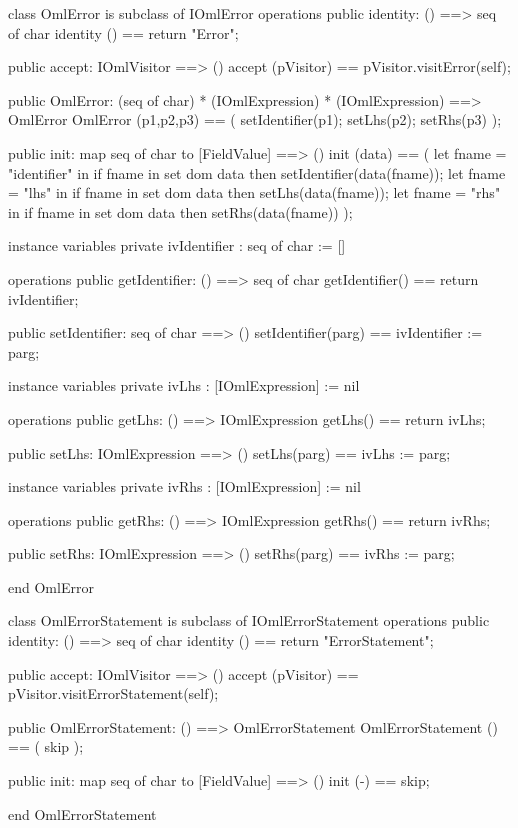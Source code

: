 \begin{vdm_al}
class OmlError is subclass of IOmlError
operations
  public identity: () ==> seq of char
  identity () == return "Error";

  public accept: IOmlVisitor ==> ()
  accept (pVisitor) == pVisitor.visitError(self);

  public OmlError:
      (seq of char) *
      (IOmlExpression) *
      (IOmlExpression) ==> OmlError
  OmlError (p1,p2,p3) == 
   ( setIdentifier(p1);
     setLhs(p2);
     setRhs(p3) );

  public init: map seq of char to [FieldValue] ==> ()
  init (data) ==
    ( let fname = "identifier" in
        if fname in set dom data
        then setIdentifier(data(fname));
      let fname = "lhs" in
        if fname in set dom data
        then setLhs(data(fname));
      let fname = "rhs" in
        if fname in set dom data
        then setRhs(data(fname)) );

instance variables
  private ivIdentifier : seq of char := []

operations
  public getIdentifier: () ==> seq of char
  getIdentifier() == return ivIdentifier;

  public setIdentifier: seq of char ==> ()
  setIdentifier(parg) == ivIdentifier := parg;

instance variables
  private ivLhs : [IOmlExpression] := nil

operations
  public getLhs: () ==> IOmlExpression
  getLhs() == return ivLhs;

  public setLhs: IOmlExpression ==> ()
  setLhs(parg) == ivLhs := parg;

instance variables
  private ivRhs : [IOmlExpression] := nil

operations
  public getRhs: () ==> IOmlExpression
  getRhs() == return ivRhs;

  public setRhs: IOmlExpression ==> ()
  setRhs(parg) == ivRhs := parg;

end OmlError
\end{vdm_al}

\begin{vdm_al}
class OmlErrorStatement is subclass of IOmlErrorStatement
operations
  public identity: () ==> seq of char
  identity () == return "ErrorStatement";

  public accept: IOmlVisitor ==> ()
  accept (pVisitor) == pVisitor.visitErrorStatement(self);

  public OmlErrorStatement:
      () ==> OmlErrorStatement
  OmlErrorStatement () == 
    ( skip );

  public init: map seq of char to [FieldValue] ==> ()
  init (-) == skip;

end OmlErrorStatement
\end{vdm_al}

